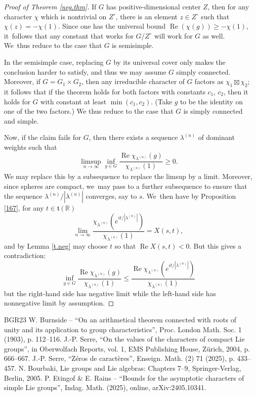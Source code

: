 \documentclass[10pt]{amsart}
\theoremstyle{definition}
\let\ic\circ
\newcommand{\mft}{\mathfrak{t}}
\newcommand{\R}{\mathbb{R}}
\DeclareMathOperator{\RE}{Re}
\numberwithin{equation}{section}
\begin{document}
\begin{proof}[Proof of Theorem \ref{neg.thm}]
If $G$ has positive-dimensional center $Z$, then for any character $\chi$
which is nontrivial on $Z^\ic$, there is an element $z\in Z^\ic$ such that
$\chi(z)=-\chi(1)$. Since one has the universal bound $\RE(\chi(g))\ge
-\chi(1)$, it~follows that any constant that works for $G/Z^\ic$ will work
for $G$ as well. We~thus reduce to the case that $G$ is semisimple.

In the semisimple case, replacing $G$ by its universal cover only makes the conclusion harder to satisfy, and thus we may assume $G$ simply connected. Moreover, if $G=G_1\times G_2$, then any irreducible character of $G$ factors as $\chi_1\boxtimes \chi_2$; it follows that if the theorem holds for both factors with constants $c_1$, $c_2$, then it holds for $G$ with constant at least $\min(c_1,c_2)$. (Take $g$ to be the identity on one of the two factors.) We thus reduce to the case that $G$ is simply connected and simple.

Now, if the claim fails for $G$, then there exists a sequence $\lambda^{(n)}$
of dominant weights such that\vspace*{-3pt}
\[
\limsup_{n\to\infty} \inf_{g\in G}
\frac{\RE\chi_{\lambda^{(n)}}(g)}{\chi_{\lambda^{(n)}}(1)}\ge 0.
\]
We may replace this by a subsequence to replace the limsup by a limit.
Moreover, since spheres are compact, we~may pass to a further subsequence
to ensure that the sequence $\lambda^{(n)}/|\lambda^{(n)}|$ converges,
say to $s$. We~then have by Proposition \ref{167}, for any $t\in \mft(\R)$\vspace*{-3pt}
\[
\lim_{n\to\infty}
\frac{\chi_{\lambda^{(n)}}(e^{it/|\lambda^{(n)}|})}{\chi_{\lambda^{(n)}}(1)}
=
X(s,t),
\]
and by Lemma \ref{t.neg} may choose $t$ so that $\RE X(s,t)<0$. But this gives a
contradiction:\vspace*{-3pt}
\[
\inf_{g\in G}
\frac{\RE\chi_{\lambda^{(n)}}(g)}{\chi_{\lambda^{(n)}}(1)}
\le
\frac{\RE \chi_{\lambda^{(n)}}(e^{it/|\lambda^{(n)}|})}{\chi_{\lambda^{(n)}}(1)}
\]
but the right-hand side has negative limit while the left-hand side has
nonnegative limit by assumption.
\end{proof}
\begin{thebibliography}{BGR23}
 W. Burnside – “On an arithmetical theorem connected with roots of unity and its application to group characteristics”, Proc. London Math. Soc. 1 (1903), p. 112–116.
 J.-P. Serre, “On the values of the characters of compact Lie groups”, in Oberwolfach Reports, vol. 1, EMS Publishing House, Zürich, 2004, p. 666–667.
 J.-P. Serre, “Zéros de caractères”, Enseign. Math. (2) 71 (2025), p. 433–457.
 N. Bourbaki, Lie groups and Lie algebras: Chapters 7–9, Springer-Verlag, Berlin, 2005.
 P. Etingof \& E. Rains – “Bounds for the asymptotic characters of simple Lie groups”, Indag. Math. (2025), online, arXiv:2405.10341.
\end{thebibliography}
\end{document}
